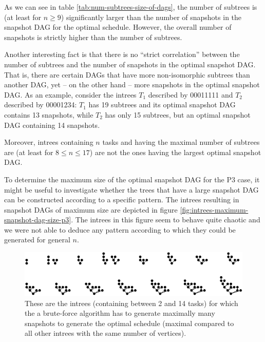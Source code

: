 As we can see in table \ref{tab:num-subtrees-size-of-dags}, the number of subtrees is (at least for $n\geq  9$) significantly larger than the number of snapshots in the snapshot DAG for the optimal schedule. However, the overall number of snapshots is strictly higher than the number of subtrees.

Another interesting fact is that there is no ``strict correlation'' between the number of subtrees and the number of snapshots in the optimal snapshot DAG. That is, there are certain DAGs that have more non-isomorphic subtrees than another DAG, yet -- on the other hand -- more snapshots in the optimal snapshot DAG. As an example, consider the intrees $T_1$ described by 00011111 and $T_2$ described by 00001234: $T_1$ has 19 subtrees and its optimal snapshot DAG contains 13 snapshots, while $T_2$ has only 15 subtrees, but an optimal snapshot DAG containing 14 snapshots.

Moreover, intrees containing $n$ tasks and having the maximal number of subtrees are (at least for $8\leq n \leq 17$) are not the ones having the largest optimal snapshot DAG.

To determine the maximum size of the optimal snapshot DAG for the P3 case, it might be useful to investigate whether the trees that have a large snapshot DAG can be constructed according to a specific pattern. The intrees resulting in snapshot DAGs of maximum size are depicted in figure \ref{fig:intrees-maximum-snapshot-dag-size-p3}. The intrees in this figure seem to behave quite chaotic and we were not able to deduce any pattern according to which they could be generated for general $n$.

\begin{figure}[t]
  \centering
  \includegraphics[scale=1.4]{p3/max_unoptimized.pdf}
  \caption{These are the intrees (containing between 2 and 14 tasks) for which the a brute-force algorithm has to generate maximally many snapshots to generate the optimal schedule (maximal compared to all other intrees with the same number of vertices).}
  \label{fig:intrees-maximum-unoptimized-p3}
\end{figure}

